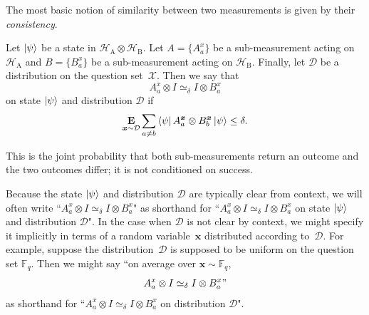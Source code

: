 \documentclass[11pt]{article}
\theoremstyle{definition}
\newcommand{\E}{\mathop{\bf E\/}}
\newcommand{\F}{\mathbb F}
\newcommand{\ot}{\otimes}
\newcommand{\calD}{\mathcal{D}}
\newcommand{\calH}{\mathcal{H}}
\newcommand{\calX}{\mathcal{X}}
\newcommand{\bx}{{\boldsymbol{x}}}
\begin{document}
The most basic notion of similarity between two measurements is given by their \emph{consistency}.

\begin{definition}[Consistency]\label{def:simeq}
Let $\ket{\psi}$ be a state in $\calH_{\mathrm{A}} \ot \calH_{\mathrm{B}}$.
Let $A = \{A^x_a\}$ be a sub-measurement acting on $\calH_{\mathrm{A}}$
and $B = \{B^x_a\}$ be a sub-measurement acting on $\calH_{\mathrm{B}}$.
Finally, let $\calD$ be a distribution on the question set~$\calX$.
Then we say that
 \begin{equation*}
 A^x_a \ot I \simeq_{\delta} I \ot B^x_a
 \end{equation*}
  on state $\ket{\psi}$ and distribution $\calD$ if
  \begin{equation}\label{eq:no-big-Oh}
  \E_{\bx \sim \calD} \sum_{a \neq b} \bra{\psi} A^{\bx}_a \ot B^{\bx}_b
    \ket{\psi} \leq \delta.
    \end{equation}
\end{definition}

This is the joint probability that both sub-measurements return an
outcome and the two outcomes differ; it is not conditioned on success.

\begin{notation}
Because the state $\ket{\psi}$ and distribution $\calD$ are typically clear from context,
we will often write ``$ A^x_a \ot I \simeq_{\delta} I \ot B^x_a$"
as shorthand for ``$ A^x_a \ot I \simeq_{\delta} I \ot B^x_a$ on state $\ket{\psi}$ and distribution $\calD$".
In the case when $\calD$ is not clear by context,
we might specify it implicitly in terms of a random variable~$\bx$ distributed according to~$\calD$.
For example, suppose the distribution~$\calD$ is supposed to be uniform on the question set $\F_q$.
Then we might say ``on average over $\bx \sim \F_q$,
\begin{equation*}
A^x_a \ot I \simeq_{\delta} I \ot B^x_a"
\end{equation*}
as shorthand for ``$ A^x_a \ot I \simeq_{\delta} I \ot B^x_a$ on distribution $\calD$".
\end{notation}
\end{document}
